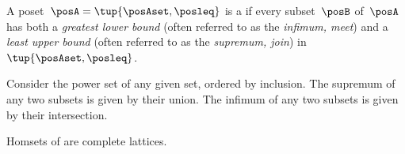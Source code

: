 \begin{definition}
    \label{def:complete-lattice}
    A poset~$\posA=\tup{\posAset,\posleq}$ is a \emph{} if every subset~$\posB$ of~$\posA$ has both a \emph{greatest lower bound} (often referred to as the \emph{infimum, meet}) and a \emph{least upper bound} (often referred to as the \emph{supremum, join}) in~$\tup{\posAset, \posleq}$.
\end{definition}

\begin{example}
    Consider the power set of any given set, ordered by inclusion.
    The supremum of any two subsets is given by their union.
    The infimum of any two subsets is given by their intersection.
\end{example}

\begin{lemma}
    \label{lem:DP-homsets-complete-lattice}
    Homsets of \DP are complete lattices.
\end{lemma}

